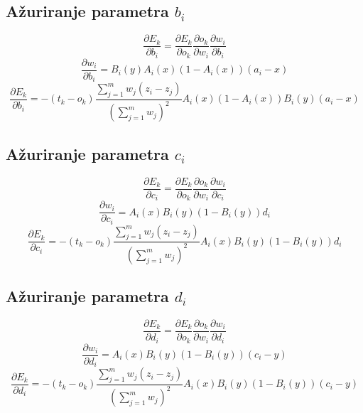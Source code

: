 \documentclass{article}
\begin{document}
\subsection{Ažuriranje parametra $ b_i $}

\begin{equation}
    \frac{\partial E_k}{\partial b_i} =
    \frac{\partial E_k}{\partial o_k} \frac{\partial o_k}{\partial w_i} \frac{\partial w_i}{\partial b_i}
\end{equation}
\begin{equation}
    \frac{\partial w_i}{\partial b_i} =
    B_i(y) A_i(x)(1 - A_i(x)) (a_i - x)
\end{equation}
\begin{equation}
    \frac{\partial E_k}{\partial b_i} =
    - (t_k - o_k) \frac{\sum_{j = 1}^{m}{w_j (z_i - z_j)}}{(\sum_{j = 1}^{m}{w_j})^2} A_i(x)(1 - A_i(x)) B_i(y) (a_i - x)
\end{equation}

\subsection{Ažuriranje parametra $ c_i $}

\begin{equation}
    \frac{\partial E_k}{\partial c_i} =
    \frac{\partial E_k}{\partial o_k} \frac{\partial o_k}{\partial w_i} \frac{\partial w_i}{\partial c_i}
\end{equation}
\begin{equation}
    \frac{\partial w_i}{\partial c_i} =
    A_i(x) B_i(y)(1 - B_i(y)) d_i
\end{equation}
\begin{equation}
    \frac{\partial E_k}{\partial c_i} =
    - (t_k - o_k) \frac{\sum_{j = 1}^{m}{w_j (z_i - z_j)}}{(\sum_{j = 1}^{m}{w_j})^2} A_i(x) B_i(y)(1 - B_i(y)) d_i
\end{equation}

\subsection{Ažuriranje parametra $ d_i $}

\begin{equation}
    \frac{\partial E_k}{\partial d_i} =
    \frac{\partial E_k}{\partial o_k} \frac{\partial o_k}{\partial w_i} \frac{\partial w_i}{\partial d_i}
\end{equation}
\begin{equation}
    \frac{\partial w_i}{\partial d_i} =
    A_i(x) B_i(y)(1 - B_i(y)) (c_i - y)
\end{equation}
\begin{equation}
    \frac{\partial E_k}{\partial d_i} =
    - (t_k - o_k) \frac{\sum_{j = 1}^{m}{w_j (z_i - z_j)}}{(\sum_{j = 1}^{m}{w_j})^2} A_i(x) B_i(y)(1 - B_i(y)) (c_i - y)
\end{equation}
\end{document}
